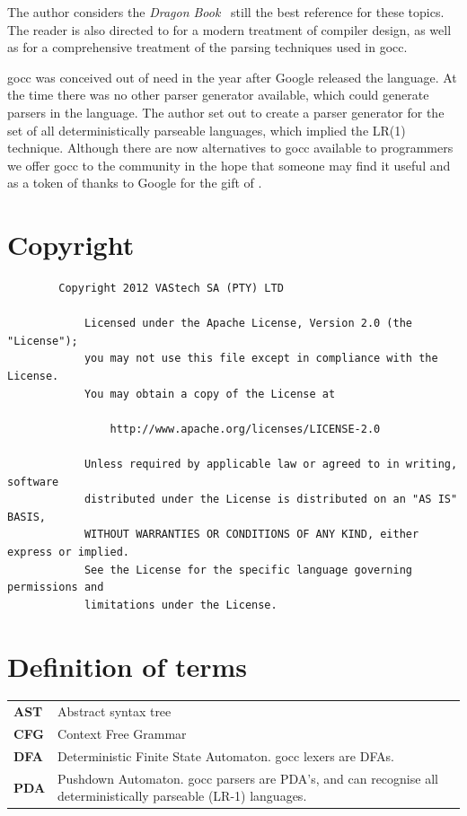 \documentclass[12pt]{article}
\begin{document}
	The author  considers the {\em Dragon Book}~\cite{Dragon Book} still the best reference for these topics. The reader is also directed to \cite{Modern Compiler Design} for a modern treatment of compiler design, as well as \cite{Parsing} for a comprehensive treatment of the parsing techniques used in gocc.

	gocc was conceived out of need in the year after Google released the \Go language. At the time there was no other parser generator available, which could generate parsers in the \Go language. The author set out to create a parser generator for the set of all deterministically parseable languages, which implied the LR(1) technique. Although there are now alternatives to gocc available to \Go programmers we offer gocc to the community in the hope that someone may find it useful and as a token of thanks to Google for the gift of \Go.

\section{Copyright}
	\begin{verbatim}
		Copyright 2012 VAStech SA (PTY) LTD
		
		    Licensed under the Apache License, Version 2.0 (the "License");
		    you may not use this file except in compliance with the License.
		    You may obtain a copy of the License at
		    
		        http://www.apache.org/licenses/LICENSE-2.0
		    
		    Unless required by applicable law or agreed to in writing, software
		    distributed under the License is distributed on an "AS IS" BASIS,
		    WITHOUT WARRANTIES OR CONDITIONS OF ANY KIND, either express or implied.
		    See the License for the specific language governing permissions and
		    limitations under the License.
	\end{verbatim}



\section{Definition of terms}
	\begin{longtable}{lp{15cm}}
		\bf AST & Abstract syntax tree\\
		\bf CFG & Context Free Grammar \\
		\bf DFA & Deterministic Finite State Automaton. gocc lexers are DFAs. \\
		\bf PDA & Pushdown Automaton. gocc parsers are PDA's, and can recognise all deterministically parseable (LR-1) languages.\\
	\end{longtable}
\end{document}

